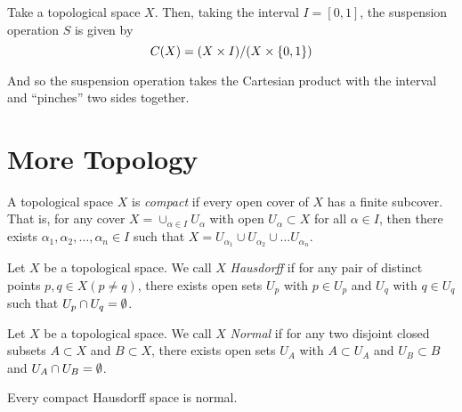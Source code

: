 \documentclass[../sean_thesis.tex]{subfiles}
\begin{document}
\begin{definition}
	Take a topological space $X$. Then, taking the interval $I = [0,1]$, the suspension operation $S$ is given by
	\begin{equation*}
		C(X) = (X \times I)/(X \times \left\{0,1\right\})
	\end{equation*}
\end{definition}

And so the suspension operation takes the Cartesian product with the interval and ``pinches'' two sides together.
 

\section{More Topology}

\begin{definition}[Compact]
    A topological space $X$ is \emph{compact} if every open cover of $X$ has a finite subcover. That is, for any cover $X = \cup_{\alpha \in I} U_\alpha$ with open $U_\alpha \subset X$ for all $\alpha \in I$, then there exists $\alpha_1, \alpha_2, \dots, \alpha_n \in I$ such that $X = U_{\alpha_1} \cup U_{\alpha_2} \cup \dots U_{\alpha_n}$.
\end{definition}

\begin{definition}[Hausdorff]
	Let $X$ be a topological space. We call $X$ \emph{Hausdorff} if for any pair of distinct points $p,q \in X (p \neq q)$, there exists open sets $U_p$ with $p \in U_p$ and $U_q$ with $q \in U_q$ such that $U_p \cap U_q = \emptyset$.
\end{definition}

\begin{definition}[Normal]
	Let $X$ be a topological space. We call $X$ \emph{Normal} if for any two disjoint closed subsets $A \subset X$ and $B \subset X$, there exists open sets $U_A$ with $A \subset U_A$ and $U_B \subset B$ and $U_A \cap U_B = \emptyset$. 
\end{definition}

\begin{theorem}
	Every compact Hausdorff space is normal.
\end{theorem}
\end{document}
